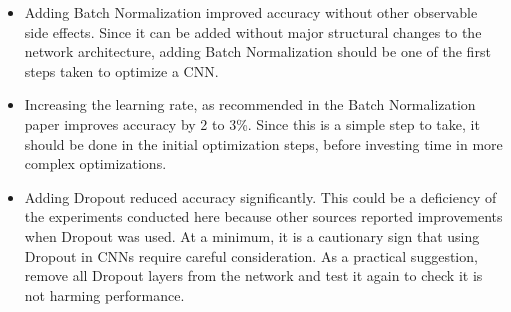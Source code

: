 \documentclass[../CAP6619_term_project_cgarbin.tex]{subfiles}
\begin{document}
\begin{itemize}
\item Adding Batch Normalization improved accuracy without other observable side effects. Since it can be added without major structural changes to the network architecture, adding Batch Normalization should be one of the first steps taken to optimize a CNN.
\item Increasing the learning rate, as recommended in the Batch Normalization paper \cite{Ioffe2015} improves accuracy by 2 to 3\%. Since this is a simple step to take, it should be done in the initial optimization steps, before investing time in more complex optimizations.
\item Adding Dropout reduced accuracy significantly. This could be a deficiency of the experiments conducted here because other sources reported improvements when Dropout was used. At a minimum, it is a cautionary sign that using Dropout in CNNs require careful consideration. As a practical suggestion, remove all Dropout layers from the network and test it again to check it is not harming performance.
\end{itemize}
\end{document}
